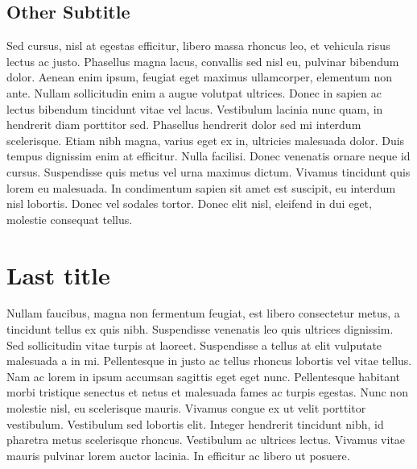 \subsection{Other Subtitle}
Sed cursus, nisl at egestas efficitur, libero massa rhoncus leo, et vehicula risus lectus ac justo. Phasellus magna lacus, convallis sed nisl eu, pulvinar bibendum dolor. Aenean enim ipsum, feugiat eget maximus ullamcorper, elementum non ante. Nullam sollicitudin enim a augue volutpat ultrices. Donec in sapien ac lectus bibendum tincidunt vitae vel lacus. Vestibulum lacinia nunc quam, in hendrerit diam porttitor sed. Phasellus hendrerit dolor sed mi interdum scelerisque. Etiam nibh magna, varius eget ex in, ultricies malesuada dolor. Duis tempus dignissim enim at efficitur. Nulla facilisi. Donec venenatis ornare neque id cursus. Suspendisse quis metus vel urna maximus dictum. Vivamus tincidunt quis lorem eu malesuada. In condimentum sapien sit amet est suscipit, eu interdum nisl lobortis. Donec vel sodales tortor. Donec elit nisl, eleifend in dui eget, molestie consequat tellus.
\section{Last title}
Nullam faucibus, magna non fermentum feugiat, est libero consectetur metus, a tincidunt tellus ex quis nibh. Suspendisse venenatis leo quis ultrices dignissim. Sed sollicitudin vitae turpis at laoreet. Suspendisse a tellus at elit vulputate malesuada a in mi. Pellentesque in justo ac tellus rhoncus lobortis vel vitae tellus. Nam ac lorem in ipsum accumsan sagittis eget eget nunc. Pellentesque habitant morbi tristique senectus et netus et malesuada fames ac turpis egestas. Nunc non molestie nisl, eu scelerisque mauris. Vivamus congue ex ut velit porttitor vestibulum. Vestibulum sed lobortis elit. Integer hendrerit tincidunt nibh, id pharetra metus scelerisque rhoncus. Vestibulum ac ultrices lectus. Vivamus vitae mauris pulvinar lorem auctor lacinia. In efficitur ac libero ut posuere. 